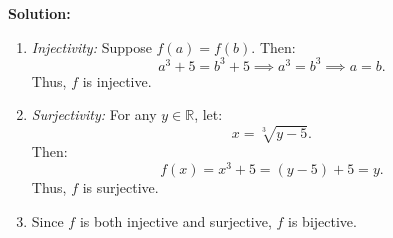 \documentclass[12pt]{article}
\theoremstyle{definition}
\begin{document}
\textbf{Solution:}

\begin{enumerate}[label=(\alph*)]
    \item \textit{Injectivity:} Suppose $f(a)=f(b)$. Then:
    \[
    a^3 + 5 = b^3 + 5 \implies a^3 = b^3 \implies a = b.
    \]
    Thus, $f$ is injective.

    \item \textit{Surjectivity:} For any $y \in \mathbb{R}$, let:
    \[
    x = \sqrt[3]{y-5}.
    \]
    Then:
    \[
    f(x) = x^3 + 5 = (y-5) + 5 = y.
    \]
    Thus, $f$ is surjective.

    \item Since $f$ is both injective and surjective, $f$ is bijective.
\end{enumerate}
\end{document}
